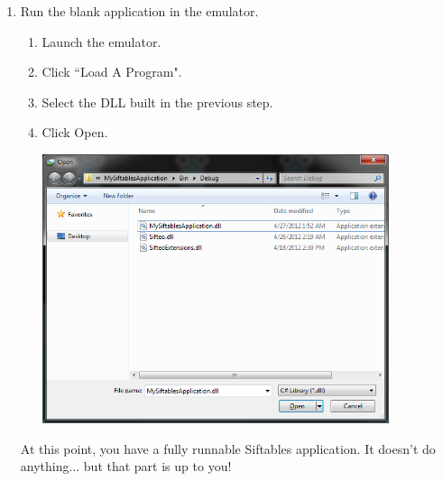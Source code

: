 \documentclass[12pt]{article}
\begin{document}
\begin{enumerate}
\item Run the blank application in the emulator.
\begin{enumerate}
\item Launch the emulator.
\item Click ``Load A Program".
\item Select the DLL built in the previous step.
\item Click Open.
\begin{center}\includegraphics[width=4in]{3-1Open}\end{center}
\end{enumerate}
At this point, you have a fully runnable Siftables application. It doesn't do anything... but that part is up to you!\\

\end{enumerate}
\end{document}
